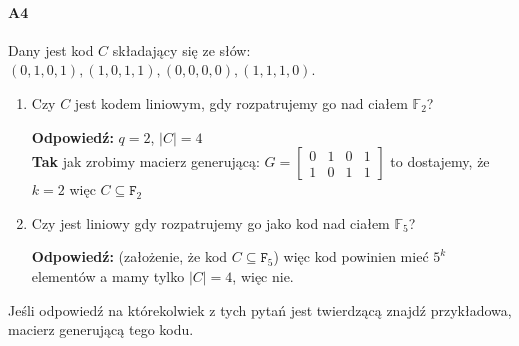 \paragraph{A4} Dany jest kod $C$ składający się ze słów: $(0, 1, 0, 1), (1, 0, 1, 1), (0, 0, 0, 0), (1, 1, 1, 0)$.
\begin{enumerate}[label=\alph*)]
\item Czy $C$ jest kodem liniowym, gdy rozpatrujemy go nad ciałem $\mathbb{F}_2$?

\textbf{Odpowiedź: }$q=2$, $|C|=4$\\
\textbf{Tak} jak zrobimy macierz generującą: $G=\begin{bmatrix}
0&1&0&1\\1&0&1&1
\end{bmatrix}$ to dostajemy, że  $k=2$ więc $C\subseteq \mathtt{F}_2$
\item Czy jest liniowy gdy rozpatrujemy go jako kod nad ciałem $\mathbb{F}_5$? 

\textbf{Odpowiedź: }(założenie, że kod $C\subseteq \mathtt{F}_5$) więc kod powinien mieć $5^k$ elementów a mamy tylko $|C|=4$, więc nie.
\end{enumerate}
Jeśli odpowiedź na którekolwiek z tych pytań jest twierdzącą znajdź przykładowa, macierz generującą tego kodu.

